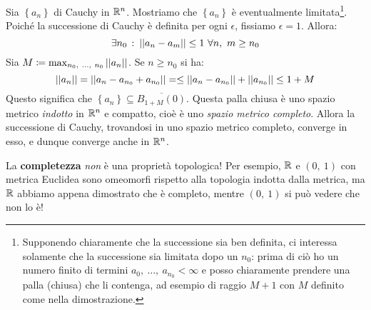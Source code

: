 \begin{demonstration}
	Sia $\left\{a_n\right\}$ di Cauchy in $\mathbb{R}^n$. Mostriamo che $\left\{a_n\right\}$ è eventualmente limitata\footnote{Supponendo chiaramente che la successione sia ben definita, ci interessa solamente che la successione sia limitata dopo un $n_0$: prima di ciò ho un numero finito di termini $a_0,\ \ldots,\ a_{n_0}<\infty$ e posso chiaramente prendere una palla (chiusa) che li contenga, ad esempio di raggio $M+1$ con $M$ definito come nella dimostrazione.}.\\
	Poiché la successione di Cauchy è definita per ogni $\epsilon$, fissiamo $\epsilon=1$. Allora:
	\begin{equation*}
	\exists n_0\ \colon \left|\left| a_n-a_m\right|\right|\leq 1\ \forall n,\ m\geq n_0
	\end{equation*}
Sia $M\coloneqq \max_{n_0,\ \ldots,\ n_0}\left|\left| a_n\right|\right|$. Se $n\geq n_0$ si ha:
\begin{equation*}
\left|\left| a_n\right|\right|=\left|\left| a_n - a_{n_0}+ a_{n_0}\right|\right|=\leq \left|\left| a_n - a_{n_0}\right|\right|+\left|\left| a_{n_0}\right|\right|\leq 1+M
\end{equation*}
Questo significa che $\left\{a_n\right\}\subseteq\overline{B_{1+M}\left(0\right)}$. Questa palla chiusa è uno spazio metrico \textit{indotto} in $\mathbb{R}^n$ e compatto, cioè è uno \textit{spazio metrico completo}. Allora la successione di Cauchy, trovandosi in uno spazio metrico completo, converge in esso, e dunque converge anche in $\mathbb{R}^n$.
\end{demonstration}
\begin{attention}
La \textbf{completezza} \textit{non} è una proprietà topologica! Per esempio, $\mathbb{R}$ e $\left(0,\ 1\right)$ con metrica Euclidea sono omeomorfi rispetto alla topologia indotta dalla metrica, ma $\mathbb{R}$ abbiamo appena dimostrato che è completo, mentre $\left(0,\ 1\right)$ si può vedere che non lo è!
\end{attention}
